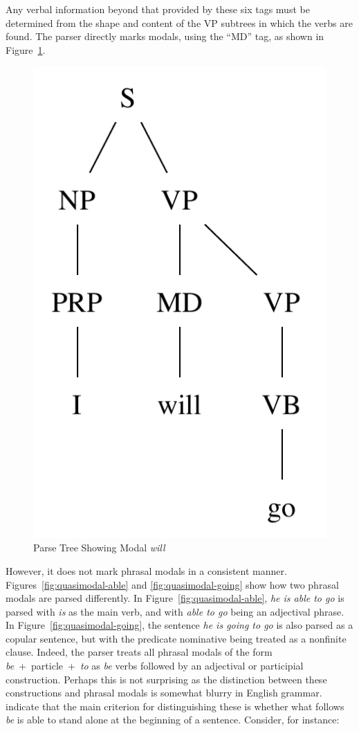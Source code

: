 \documentclass[main.tex]{subfiles}
\begin{document}
Any verbal information beyond that provided by these six tags must be determined from the shape and content of the VP subtrees in which the verbs are found. The parser directly marks modals, using the ``MD'' tag, as shown in Figure~\ref{fig:modal-parse}.
\begin{figure}[htbp]
\centering
\includegraphics[scale=0.6]{modal-parse.pdf}
\caption{Parse Tree Showing Modal \textit{will}}
\label{fig:modal-parse}
\end{figure}
However, it does not mark phrasal modals in a consistent manner. Figures~\ref{fig:quasimodal-able} and \ref{fig:quasimodal-going} show how two phrasal modals are parsed differently. In Figure~\ref{fig:quasimodal-able}, \textit{he is able to go} is parsed with \textit{is} as the main verb, and with \textit{able to go} being an adjectival phrase. In Figure~\ref{fig:quasimodal-going}, the sentence \textit{he is going to go} is also parsed as a copular sentence, but with the predicate nominative being treated as a nonfinite clause. Indeed, the parser treats all phrasal modals of the form \textit{be}~+~particle~+~\textit{to} as \textit{be} verbs followed by an adjectival or participial construction. Perhaps this is not surprising as the distinction between these constructions and phrasal modals is somewhat blurry in English grammar. \citet[footnote, p. 144]{quirk:1985} indicate that the main criterion for distinguishing these is whether what follows \textit{be} is able to stand alone at the beginning of a sentence. Consider, for instance:
\end{document}
